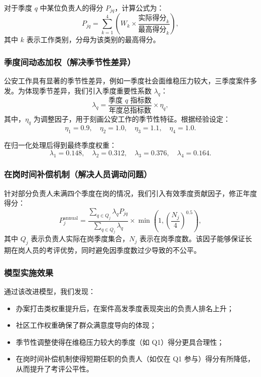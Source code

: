 \documentclass[12pt]{ctexart}
\begin{document}
	对于季度 $q$ 中某位负责人的得分 $P_{jq}$，计算公式为：
	\begin{equation}
		P_{jq} = \sum_{k=1}^{4} \left( W_k \times \frac{\text{实际得分}_{k}}{\text{最高得分}_{k}} \right),
		\label{eq:p_jq}
	\end{equation}
	其中 $k$ 表示工作类别，分母为该类别的最高得分。
	
	\subsubsection{季度间动态加权（解决季节性差异）}
	
	公安工作具有显著的季节性差异，例如一季度社会面维稳压力较大，三季度案件多发。为体现季节差异，我们引入季度重要性系数 $\lambda_q$：
	\begin{equation}
		\lambda_q = \frac{\text{季度 $q$ 指标数}}{\text{年度总指标数}} \times \eta_q,
		\label{eq:lambda_q}
	\end{equation}
	其中，$\eta_q$ 为调整因子，用于刻画公安工作的季节性特征。根据经验设定：
	\[
	\eta_1 = 0.9, \quad \eta_2 = 1.0, \quad \eta_3 = 1.1, \quad \eta_4 = 1.0.
	\]
	
	在归一化处理后得到最终季度权重：
	\[
	\lambda_1=0.148, \quad \lambda_2=0.312, \quad \lambda_3=0.376, \quad \lambda_4=0.164.
	\]
	
	\subsubsection{在岗时间补偿机制（解决人员调动问题）}
	
	针对部分负责人未满四个季度在岗的情况，我们引入有效季度贡献因子，修正年度得分：
	\begin{equation}
		P_j^{\text{annual}} = \frac{\sum_{q \in Q_j} \lambda_q P_{jq}}{\sum_{q \in Q_j} \lambda_q}
		\times \min\left(1, \left(\frac{N_j}{4}\right)^{0.5}\right),
		\label{eq:annual}
	\end{equation}
	其中 $Q_j$ 表示负责人实际在岗季度集合，$N_j$ 表示在岗季度数。该因子能够保证长期在岗人员的考评优势，同时避免因季度数过少导致的不公平。
	
	\subsubsection{模型实施效果}
	
	通过该改进模型，我们发现：
	\begin{itemize}
		\item 办案打击类权重提升后，在案件高发季度表现突出的负责人排名上升；
		\item 社区工作权重确保了群众满意度导向的体现；
		\item 季节性调整使得在维稳压力较大的季度（如 Q1）得分更具合理性；
		\item 在岗时间补偿机制使得短期任职的负责人（如仅在 Q1 参与）得分有所降低，从而提升了考评公平性。
	\end{itemize}
	
\end{document}
